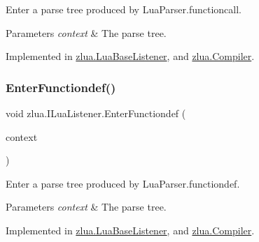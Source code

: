 Enter a parse tree produced by Lua\+Parser.\+functioncall. 


\begin{DoxyParams}{Parameters}
{\em context} & The parse tree.\\
\hline
\end{DoxyParams}


Implemented in \mbox{\hyperlink{classzlua_1_1_lua_base_listener_a5a20690d44ed7bea5265200a10bd3ade}{zlua.\+Lua\+Base\+Listener}}, and \mbox{\hyperlink{classzlua_1_1_compiler_a17169577cf49b4387d6f65f07354e370}{zlua.\+Compiler}}.

\mbox{\label{interfacezlua_1_1_i_lua_listener_af2184c75516162b18685ef6dce9e9047}} 
\subsubsection{\texorpdfstring{Enter\+Functiondef()}{EnterFunctiondef()}}
{\footnotesize\ttfamily void zlua.\+I\+Lua\+Listener.\+Enter\+Functiondef (\begin{DoxyParamCaption}\item[{\mbox{[}\+Not\+Null\mbox{]} \mbox{\hyperlink{classzlua_1_1_lua_parser_1_1_functiondef_context}{Lua\+Parser.\+Functiondef\+Context}}}]{context }\end{DoxyParamCaption})}



Enter a parse tree produced by Lua\+Parser.\+functiondef. 


\begin{DoxyParams}{Parameters}
{\em context} & The parse tree.\\
\hline
\end{DoxyParams}


Implemented in \mbox{\hyperlink{classzlua_1_1_lua_base_listener_a3882098639066deade08be5eb8d94f70}{zlua.\+Lua\+Base\+Listener}}, and \mbox{\hyperlink{classzlua_1_1_compiler_a2e238ee43fa902a36201d2cae25375a1}{zlua.\+Compiler}}.

\mbox{\label{interfacezlua_1_1_i_lua_listener_add4d956e68d0679849896d682e181800}} 
